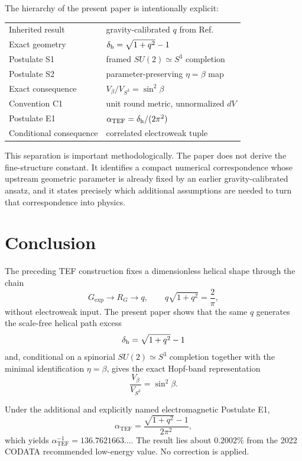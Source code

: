 \documentclass[10pt,twocolumn]{article}
\newcommand{\TEF}{\mathrm{TEF}}
\newcommand{\Exp}{\mathrm{exp}}
\begin{document}
The hierarchy of the present paper is intentionally explicit:
\begin{center}
\small
\begin{tabular}{@{}p{}p{}@{}}
Inherited result & gravity-calibrated $q$ from Ref.~\cite{WuCompanion} \\
Exact geometry & $\delta_{\rm h}=\sqrt{1+q^2}-1$ \\
Postulate S1 & framed $SU(2)\simeq S^3$ completion \\
Postulate S2 & parameter-preserving $\eta=\beta$ map \\
Exact consequence & $V_\beta/V_{S^3}=\sin^2\beta$ \\
Convention C1 & unit round metric, unnormalized $dV$ \\
Postulate E1 & $\alpha_{\TEF}=\delta_{\rm h}/(2\pi^2)$ \\
Conditional consequence & correlated electroweak tuple \\
\end{tabular}
\end{center}
This separation is important methodologically.  The paper does not derive the fine-structure constant.
It identifies a compact numerical correspondence whose upstream geometric parameter is already fixed
by an earlier gravity-calibrated ansatz, and it states precisely which additional assumptions are needed
to turn that correspondence into physics.

\section{Conclusion}

The preceding TEF construction fixes a dimensionless helical shape through the chain
\begin{equation}
G_{\Exp}\to R_G\to q,
\qquad
q\sqrt{1+q^2}=\frac{2}{\pi},
\end{equation}
without electroweak input.  The present paper shows that the same $q$ generates the scale-free
helical path excess
\begin{equation}
\delta_{\rm h}=\sqrt{1+q^2}-1
\end{equation}
and, conditional on a spinorial $SU(2)\simeq S^3$ completion together with the minimal
identification $\eta=\beta$, gives the exact Hopf-band representation
\begin{equation}
\frac{V_\beta}{V_{S^3}}=\sin^2\beta.
\end{equation}

Under the additional and explicitly named electromagnetic Postulate E1,
\begin{equation}
\boxed{
\alpha_{\TEF}=\frac{\sqrt{1+q^2}-1}{2\pi^2},
}
\end{equation}
which yields $\alpha_{\TEF}^{-1}=136.7621663\ldots$.  The result lies about $0.2002\%$ from the
2022 CODATA recommended low-energy value.  No correction is applied.
\end{document}
